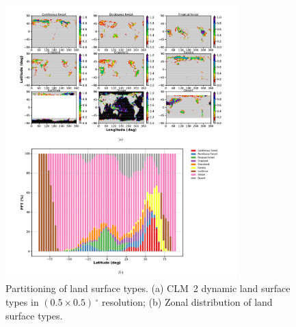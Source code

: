 \documentclass[gmd, manuscript]{copernicus}
\begin{document}
\appendixfigures
\begin{figure}[!htbp]
  \centering
  \includegraphics[width=0.8\textwidth]{fig11}
  \caption{Partitioning of land surface types. (a) CLM~2 dynamic land surface types in $(0.5\times0.5)\,\unit{^\circ}$ resolution; (b) Zonal distribution of land surface types.}
  \label{fig:pft_landsurface}
\end{figure}



\noappendix       %



\end{document}
